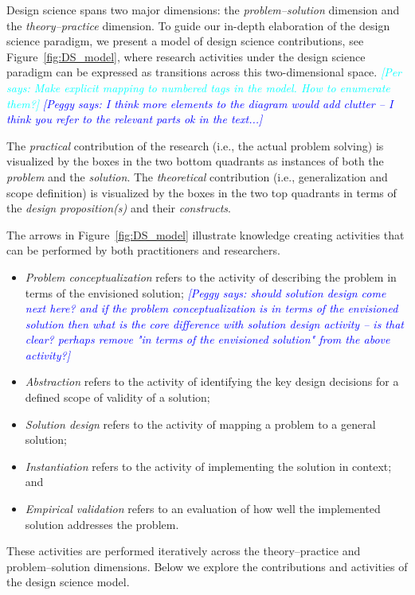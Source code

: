 \documentclass[graybox]{svmult}
\newcommand{\peggy}[1]{\textcolor{blue}{{\it [Peggy says: #1]}}}
\newcommand{\per}[1]{\textcolor{cyan}{{\it [Per says: #1]}}}
\newcommand{\peggy}[1]{}
\newcommand{\per}[1]{}
\begin{document}
Design science spans two major dimensions: the \emph{problem--solution} dimension and the \emph{theory--practice} dimension. To guide our in-depth elaboration of the design science paradigm, we present a model of design science contributions, see Figure~\ref{fig:DS_model}, where research activities under the design science paradigm can be expressed as transitions across this two-dimensional space.
\per{Make explicit mapping to numbered tags in the model. How to enumerate them?}
\peggy{I think more elements to the diagram would add clutter -- I think you refer to the relevant parts ok in the text...}

The \emph{practical} contribution of the research (i.e., the actual problem solving) is visualized by the boxes in the two bottom quadrants as instances of both the \emph{problem} and the \emph{solution}. The \emph{theoretical} contribution (i.e., generalization and scope definition) is visualized by the boxes in the two top quadrants in terms of the \emph{design proposition(s)} and their \emph{constructs}. 

The arrows in Figure~\ref{fig:DS_model} illustrate knowledge creating activities that can be performed by both practitioners and researchers. 
\begin{itemize}
\item \emph{Problem conceptualization} refers to the activity of describing the problem in terms of the envisioned solution; 
\peggy{should solution design come next here? and if the problem conceptualization is in terms of the envisioned solution then what is the core difference with solution design activity -- is that clear? perhaps remove "in terms of the envisioned solution" from the above activity?}
\item \emph{Abstraction} refers to the activity of identifying the key design decisions for a defined scope of validity of a solution; 
\item \emph{Solution design} refers to the activity of mapping a problem to a general solution; 
\item \emph{Instantiation} refers to the activity of implementing the solution in context; and 
\item \emph{Empirical validation} refers to an evaluation of how well the implemented solution addresses the problem.
\end{itemize}

These activities are performed iteratively across the theory--practice and problem--solution dimensions. Below we explore the contributions and activities of the design science model. 
\end{document}
